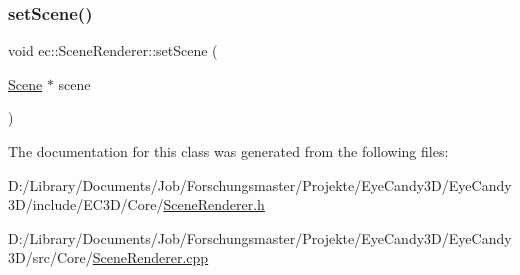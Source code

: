 \subsubsection{\texorpdfstring{set\+Scene()}{setScene()}}
{\footnotesize\ttfamily void ec\+::\+Scene\+Renderer\+::set\+Scene (\begin{DoxyParamCaption}\item[{\mbox{\hyperlink{classec_1_1_scene}{Scene}} $\ast$}]{scene }\end{DoxyParamCaption})}



The documentation for this class was generated from the following files\+:\begin{DoxyCompactItemize}
\item 
D\+:/\+Library/\+Documents/\+Job/\+Forschungsmaster/\+Projekte/\+Eye\+Candy3\+D/\+Eye\+Candy3\+D/include/\+E\+C3\+D/\+Core/\mbox{\hyperlink{_scene_renderer_8h}{Scene\+Renderer.\+h}}\item 
D\+:/\+Library/\+Documents/\+Job/\+Forschungsmaster/\+Projekte/\+Eye\+Candy3\+D/\+Eye\+Candy3\+D/src/\+Core/\mbox{\hyperlink{_scene_renderer_8cpp}{Scene\+Renderer.\+cpp}}\end{DoxyCompactItemize}
